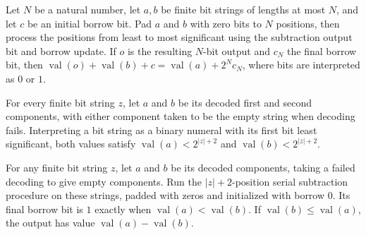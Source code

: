 \begin{theorem}
\label{Complexity.BinArith.serial_sub}
\leanok
{}
Let $N$ be a natural number, let $a,b$ be finite bit strings of lengths at most $N$, and
let $c$ be an initial borrow bit. Pad $a$ and $b$ with zero bits to $N$ positions, then
process the positions from least to most significant using the subtraction output bit
and borrow update. If $o$ is the resulting $N$-bit output and $c_N$ the final borrow
bit, then $\operatorname{val}(o)+\operatorname{val}(b)+c=\operatorname{val}(a)+2^N c_N$,
where bits are interpreted as $0$ or $1$.
\end{theorem}

\begin{theorem}
\label{Complexity.BinArith.serial_bounds}
\leanok
{}
For every finite bit string $z$, let $a$ and $b$ be its decoded first and second
components, with either component taken to be the empty string when decoding fails.
Interpreting a bit string as a binary numeral with its first bit least significant, both
values satisfy $\operatorname{val}(a)<2^{|z|+2}$ and $\operatorname{val}(b)<2^{|z|+2}$.
\end{theorem}

\begin{theorem}
\label{Complexity.BinArith.serial_sub_spec}
\leanok
{}
For any finite bit string $z$, let $a$ and $b$ be its decoded components, taking a
failed decoding to give empty components. Run the $|z|+2$-position serial subtraction
procedure on these strings, padded with zeros and initialized with borrow $0$. Its final
borrow bit is $1$ exactly when $\operatorname{val}(a)<\operatorname{val}(b)$. If
$\operatorname{val}(b)\le\operatorname{val}(a)$, the output has value
$\operatorname{val}(a)-\operatorname{val}(b)$.
\end{theorem}

